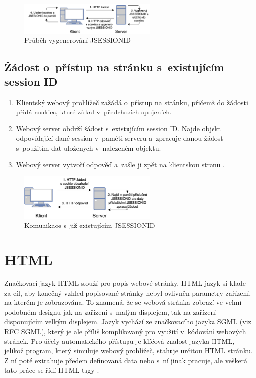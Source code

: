 \begin{figure}[hbt]
	\centering
	\includegraphics[width=0.6\textwidth]{images/cookie.png}
	\caption{Průběh vygenerování JSESSIONID}
	\label{img:session_ID_generate}
\end{figure}

\subsection*{Žádost o~přístup na stránku s~existujícím session ID}
\begin{enumerate}
  \item Klientský webový prohlížeč zažádá o~přístup na stránku, přičemž do žádosti přidá cookies, které získal v~předchozích spojeních.
  \item Webový server obdrží žádost s~existujícím session ID. Najde objekt odpovídající dané session v~paměti serveru a~zpracuje danou žádost s~použitím dat uložených v~nalezeném objektu.
  \item Webový server vytvoří odpověď a~zašle ji zpět na klientskou stranu \cite{bib:session_connection}.
\end{enumerate}

\begin{figure}[hbt]
	\centering
	\includegraphics[width=0.6\textwidth]{images/cookie_repeat.png}
	\caption{Komunikace s~již existujícím JSESSIONID}
	\label{img:session_ID_created}
\end{figure}


\section{HTML}
\label{sec:html}
Značkovací jazyk HTML slouží pro popis webové stránky. HTML jazyk si klade za cíl, aby konečný vzhled popisované stránky nebyl ovlivněn parametry zařízení, na kterém je zobrazována. To znamená, že se webová stránka zobrazí ve velmi podobném designu jak na zařízení s~malým displejem, tak na zařízení disponujícím velkým displejem. Jazyk vychází ze značkovacího jazyka SGML (viz \href{https://tools.ietf.org/html/rfc1874}{RFC SGML}), který je ale příliš komplikovaný pro využití v~kódování webových stránek. Pro účely automatického přístupu je klíčová znalost jazyka HTML, jelikož program, který simuluje webový prohlížeč, stahuje určitou HTML stránku. Z ní poté extrahuje předem definovaná data nebo s~ní jinak pracuje, ale veškerá tato práce se řídí HTML tagy \cite{bib:htmlRFC}.

